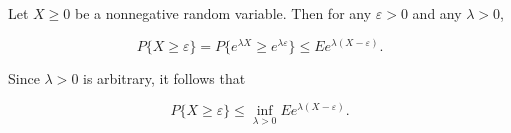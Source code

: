 Let $X \geq 0$ be a nonnegative random variable. Then for any $\varepsilon > 0$ and any $\lambda > 0$,

$$P\{X \geq \varepsilon\} = P\{e^{\lambda X} \geq e^{\lambda \varepsilon}\} \leq E e^{\lambda(X - \varepsilon)}.$$

Since $\lambda > 0$ is arbitrary, it follows that

$$P\{X \geq \varepsilon\} \leq \inf_{\lambda > 0} E e^{\lambda(X - \varepsilon)}.$$
